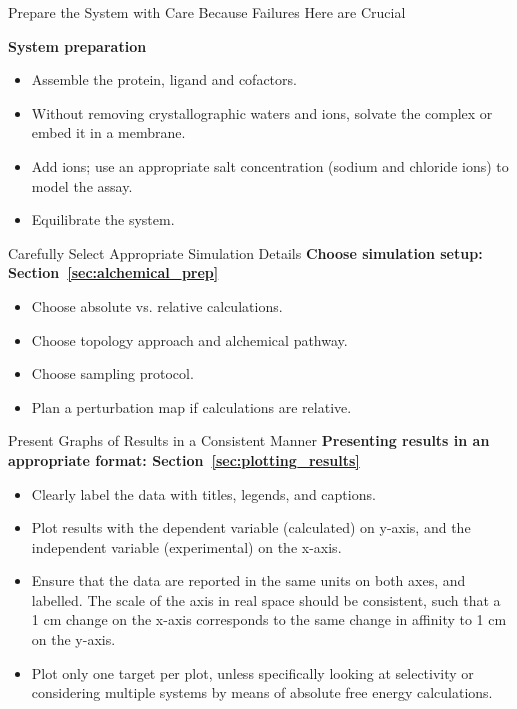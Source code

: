 \documentclass[9pt,bestpractices,pubversion]{livecoms}
\begin{document}
\begin{Checklists*}[hp!]
\begin{checklist}{Prepare the System with Care Because Failures Here are Crucial}
\begin{itemize}
\begin{itemize}
    \end{itemize}
    \end{itemize}
        \textbf{System preparation}
    \begin{itemize}
        \item Assemble the protein, ligand and cofactors. 
        \item Without removing crystallographic waters and ions, solvate the complex or embed it in a membrane. 
        \item Add ions; use an appropriate salt concentration (sodium and chloride ions) to model the assay.
        \item Equilibrate the system.
    \end{itemize}
\end{checklist}

\begin{checklist}{Carefully Select Appropriate Simulation Details}
\textbf{Choose simulation setup: Section~\ref{sec:alchemical_prep}}
    \begin{itemize}
        \item Choose absolute vs. relative calculations.
        \item Choose topology approach and alchemical pathway.
        \item Choose sampling protocol.
        \item Plan a perturbation map if calculations are relative.
    \end{itemize}
\end{checklist}
\begin{checklist}{Present Graphs of Results in a Consistent Manner}
\textbf{Presenting results in an appropriate format: Section~\ref{sec:plotting_results}}
\begin{itemize}
\item Clearly label the data with titles, legends, and captions.
\item Plot results with the dependent variable (calculated) on y-axis, and the independent variable (experimental) on the x-axis. 
\item Ensure that the data are reported in the same units on both axes, and labelled. The scale of the axis in real space should be consistent, such that a 1 cm change on the x-axis corresponds to the same change in affinity to 1 cm on the y-axis.
\item Plot only one target per plot, unless specifically looking at selectivity or considering multiple systems by means of absolute free energy calculations.
\end{itemize}
\end{checklist}
\end{Checklists*}
\end{document}
